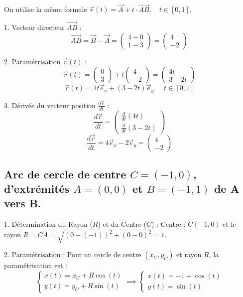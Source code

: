 \documentclass[french]{yLectureNote}
\renewcommand{\vec}{\overrightarrow}
\begin{document}
On utilise la même formule $\vec{r}(t) = \vec{A} + t \cdot \vec{AB}, \quad t \in [0, 1]$.

1.  Vecteur directeur $\vec{AB}$ :
    $$\vec{AB} = \vec{B} - \vec{A} = \begin{pmatrix} 4 - 0 \\ 1 - 3 \end{pmatrix} = \begin{pmatrix} 4 \\ -2 \end{pmatrix}$$

2.  Paramétrisation $\vec{r}(t)$ :
    $$\vec{r}(t) = \begin{pmatrix} 0 \\ 3 \end{pmatrix} + t \begin{pmatrix} 4 \\ -2 \end{pmatrix} = \begin{pmatrix} 4t \\ 3 - 2t \end{pmatrix}$$
    $$\vec{r}(t) = 4t \vec{e}_x + (3 - 2t) \vec{e}_y, \quad t \in [0, 1]$$

3.  Dérivée du vecteur position $\frac{d\vec{r}}{dt}$ :
    $$\frac{d\vec{r}}{dt} = \begin{pmatrix} \frac{d}{dt}(4t) \\ \frac{d}{dt}(3 - 2t) \end{pmatrix}$$
    $$\frac{d\vec{r}}{dt} = 4 \vec{e}_x - 2 \vec{e}_y = \begin{pmatrix} 4 \\ -2 \end{pmatrix}$$
\subsection{Arc de cercle de centre $C=(-1,0)$, d'extrémités $A=(0,0)$ et $B=(-1,1)$ de A vers B.}

1.  Détermination du Rayon ($R$) et du Centre ($C$) : Centre : $C(-1, 0)$ et le rayon $R = CA = \sqrt{(0 - (-1))^2 + (0 - 0)^2} = 1$.

2.  Paramétrisation :
    Pour un cercle de centre $(x_C, y_C)$ et rayon $R$, la paramétrisation est :
    $$\begin{cases} x(t) = x_C + R \cos(t) \\ y(t) = y_C + R \sin(t) \end{cases} \implies \begin{cases} x(t) = -1 + \cos(t) \\ y(t) = \sin(t) \end{cases}$$
\end{document}

